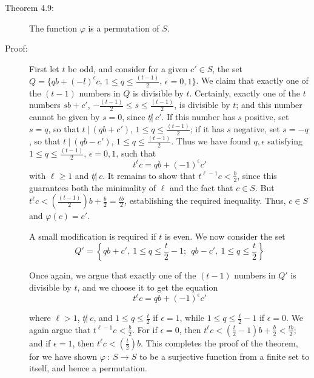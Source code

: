 \begin{description}

  \item[Theorem 4.9:] The function $\varphi$ is a permutation of $S$.

  \item[Proof:] First let $t$ be odd, and consider for a given $c' \in S$, the set $Q = \{ qb + (-l)^{\epsilon} c$, $1 \leq q \leq \frac{(t-1)}{2}$, $\epsilon = 0,1 \}$. We claim that exactly one of the $(t-1)$ numbers in $Q$ is divisible by $t$. Certainly, exactly one of the $t$ numbers $sb + c'$, $-\frac{(t-1)}{2} \leq s \leq \frac{(t-1)}{2}$, is divisible by $t$; and this number cannot be given by $s = 0$, since $t \not|\ c'$. If this number has $s$ positive, set $s = q$, so that $t\ |\ (qb + c')$, $1 \leq q \leq \frac{(t-1)}{2}$; if it has $s$ negative, set $s = -q$, so that $t\ |\ (qb - c')$, $1 \leq q \leq \frac{(t-1)}{2}$. Thus we have found $q,\epsilon$ satisfying $1 \leq q \leq \frac{(t-1)}{2}$, $\epsilon = 0,1$, such that
    \begin{equation*}
    t^{\ell} c = qb + (-1)^{\epsilon} c'
    \end{equation*}
    with $\ell \geq 1$ and $t \not|\ c$. It remains to show that $t^{\ell-1} c < \frac{b}{2}$, since this guarantees both the minimality of $\ell$ and the fact that $c \in S$. But $t^{\ell} c < \left( \frac{(t-1)}{2} \right) b + \frac{b}{2} = \frac{tb}{2}$, establishing the required inequality. Thus, $c \in S$ and $\varphi(c) = c'$.

    A small modification is required if $t$ is even. We now consider the set
    \begin{equation*}
    Q' = \left\{ qb+c',\ 1 \leq q \leq \frac{t}{2}-1;\ \ qb-c',\ 1 \leq q \leq \frac{t}{2} \right\}
    \end{equation*}

    Once again, we argue that exactly one of the $(t-1)$ numbers in $Q'$ is divisible by $t$, and we choose it to get the equation
    \begin{equation*}
    t^{\ell} c = qb + (-1)^{\epsilon} c'
    \end{equation*}

    where $\ell > 1$, $t \not|\ c$, and $1 \leq q \leq \frac{t}{2}$ if $\epsilon = 1$, while $1 \leq q \leq \frac{t}{2}-1$ if $\epsilon = 0$. We again argue that $t^{\ell-1} c < \frac{b}{2}$. For if $\epsilon = 0$, then $t^{\ell} c < \left( \frac{t}{2}-1 \right) b + \frac{b}{2} < \frac{tb}{2}$; and if $\epsilon = 1$, then $t^{\ell} c < \left( \frac{t}{2} \right) b$. This completes the proof of the theorem, for we have shown $\varphi\ :\ S \rightarrow S$ to be a surjective function from a finite set to itself, and hence a permutation.


\end{description}
